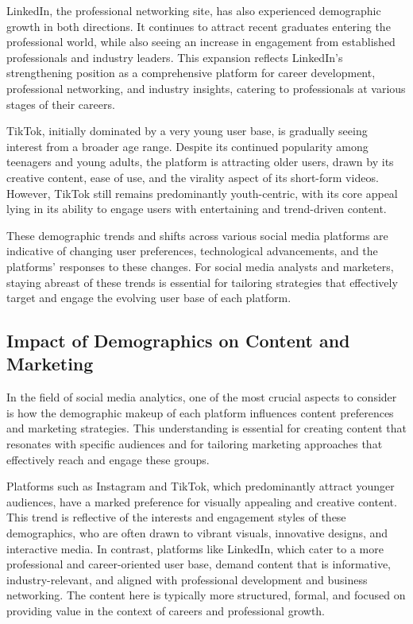 \documentclass[
]{book}
\begin{document}
LinkedIn, the professional networking site, has also experienced demographic growth in both directions. It continues to attract recent graduates entering the professional world, while also seeing an increase in engagement from established professionals and industry leaders. This expansion reflects LinkedIn's strengthening position as a comprehensive platform for career development, professional networking, and industry insights, catering to professionals at various stages of their careers.

TikTok, initially dominated by a very young user base, is gradually seeing interest from a broader age range. Despite its continued popularity among teenagers and young adults, the platform is attracting older users, drawn by its creative content, ease of use, and the virality aspect of its short-form videos. However, TikTok still remains predominantly youth-centric, with its core appeal lying in its ability to engage users with entertaining and trend-driven content.

These demographic trends and shifts across various social media platforms are indicative of changing user preferences, technological advancements, and the platforms' responses to these changes. For social media analysts and marketers, staying abreast of these trends is essential for tailoring strategies that effectively target and engage the evolving user base of each platform.

\hypertarget{impact-of-demographics-on-content-and-marketing}{%
\subsection*{Impact of Demographics on Content and Marketing}\label{impact-of-demographics-on-content-and-marketing}}

In the field of social media analytics, one of the most crucial aspects to consider is how the demographic makeup of each platform influences content preferences and marketing strategies. This understanding is essential for creating content that resonates with specific audiences and for tailoring marketing approaches that effectively reach and engage these groups.

Platforms such as Instagram and TikTok, which predominantly attract younger audiences, have a marked preference for visually appealing and creative content. This trend is reflective of the interests and engagement styles of these demographics, who are often drawn to vibrant visuals, innovative designs, and interactive media. In contrast, platforms like LinkedIn, which cater to a more professional and career-oriented user base, demand content that is informative, industry-relevant, and aligned with professional development and business networking. The content here is typically more structured, formal, and focused on providing value in the context of careers and professional growth.
\end{document}
